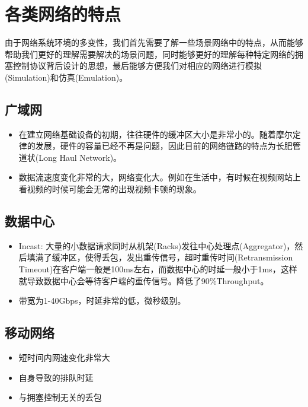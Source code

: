 \documentclass[a4paper, 12pt, UTF8]{ctexart}
\begin{document}
\clearpage

\section{各类网络的特点}
\par 由于网络系统环境的多变性，我们首先需要了解一些场景网络中的特点，从而能够帮助我们更好的理解需要解决的场景问题，同时能够更好的理解每种特定网络的拥塞控制协议背后设计的思想，最后能够方便我们对相应的网络进行模拟(Simulation)和仿真(Emulation)。

\subsection{广域网}
\begin{itemize}
	\item 在建立网络基础设备的初期，往往硬件的缓冲区大小是非常小的。随着摩尔定律的发展，硬件的容量已经不再是问题，因此目前的网络链路的特点为长肥管道状(Long Haul Network)。\cite{BDP}
	\item 数据流速度变化非常的大，网络变化大。例如在生活中，有时候在视频网站上看视频的时候可能会无常的出现视频卡顿的现象。
\end{itemize}

\subsection{数据中心}

\begin{itemize}
	\item Incast: 大量的小数据请求同时从机架(Racks)发往中心处理点(Aggregator)，然后填满了缓冲区，使得丢包，发出重传信号，超时重传时间(Retransmission Timeout)在客户端一般是100ms左右，而数据中心的时延一般小于1ms，这样就导致数据中心会等待客户端的重传信号。降低了90\%Throughput。
	\item 带宽为1-40Gbps，时延非常的低，微秒级别。
\end{itemize}

\subsection{移动网络}

\begin{itemize}
	\item 短时间内网速变化非常大
	\item 自身导致的排队时延
	\item 与拥塞控制无关的丢包
\end{itemize}
\end{document}
